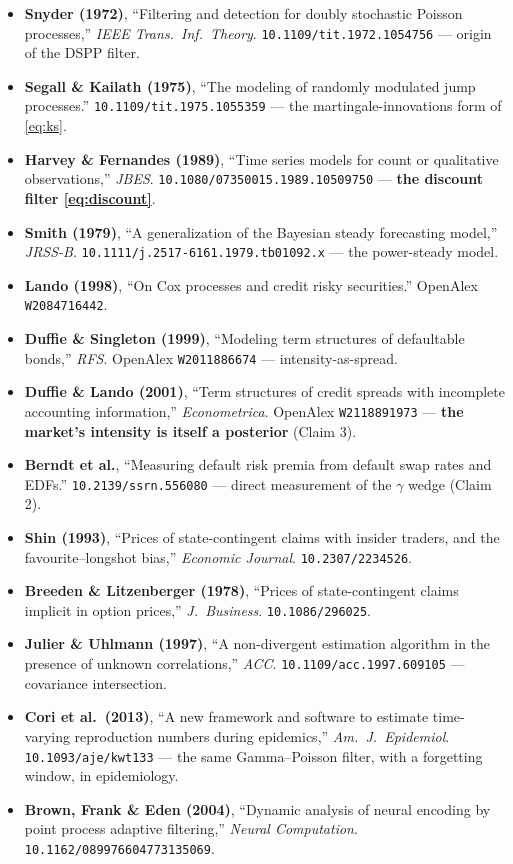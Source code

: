 \documentclass[11pt,a4paper]{article}
\theoremstyle{plain}
\begin{document}
\begin{itemize}[leftmargin=1em]
\item \textbf{Snyder (1972)}, ``Filtering and detection for doubly stochastic Poisson processes,''
      \emph{IEEE Trans.\ Inf.\ Theory}. \texttt{10.1109/tit.1972.1054756} --- origin of the DSPP filter.
\item \textbf{Segall \& Kailath (1975)}, ``The modeling of randomly modulated jump processes.''
      \texttt{10.1109/tit.1975.1055359} --- the martingale-innovations form of \eqref{eq:ks}.
\item \textbf{Harvey \& Fernandes (1989)}, ``Time series models for count or qualitative observations,''
      \emph{JBES}. \texttt{10.1080/07350015.1989.10509750} --- \textbf{the discount filter \eqref{eq:discount}}.
\item \textbf{Smith (1979)}, ``A generalization of the Bayesian steady forecasting model,''
      \emph{JRSS-B}. \texttt{10.1111/j.2517-6161.1979.tb01092.x} --- the power-steady model.
\item \textbf{Lando (1998)}, ``On Cox processes and credit risky securities.'' OpenAlex \texttt{W2084716442}.
\item \textbf{Duffie \& Singleton (1999)}, ``Modeling term structures of defaultable bonds,''
      \emph{RFS}. OpenAlex \texttt{W2011886674} --- intensity-as-spread.
\item \textbf{Duffie \& Lando (2001)}, ``Term structures of credit spreads with incomplete accounting
      information,'' \emph{Econometrica}. OpenAlex \texttt{W2118891973} --- \textbf{the market's intensity is
      itself a posterior} (Claim 3).
\item \textbf{Berndt et al.}, ``Measuring default risk premia from default swap rates and EDFs.''
      \texttt{10.2139/ssrn.556080} --- direct measurement of the $\gamma$ wedge (Claim 2).
\item \textbf{Shin (1993)}, ``Prices of state-contingent claims with insider traders, and the
      favourite--longshot bias,'' \emph{Economic Journal}. \texttt{10.2307/2234526}.
\item \textbf{Breeden \& Litzenberger (1978)}, ``Prices of state-contingent claims implicit in option
      prices,'' \emph{J.\ Business}. \texttt{10.1086/296025}.
\item \textbf{Julier \& Uhlmann (1997)}, ``A non-divergent estimation algorithm in the presence of
      unknown correlations,'' \emph{ACC}. \texttt{10.1109/acc.1997.609105} --- covariance intersection.
\item \textbf{Cori et al.\ (2013)}, ``A new framework and software to estimate time-varying reproduction
      numbers during epidemics,'' \emph{Am.\ J.\ Epidemiol}. \texttt{10.1093/aje/kwt133} --- the same
      Gamma--Poisson filter, with a forgetting window, in epidemiology.
\item \textbf{Brown, Frank \& Eden (2004)}, ``Dynamic analysis of neural encoding by point process adaptive
      filtering,'' \emph{Neural Computation}. \texttt{10.1162/089976604773135069}.
\end{itemize}
\end{document}
